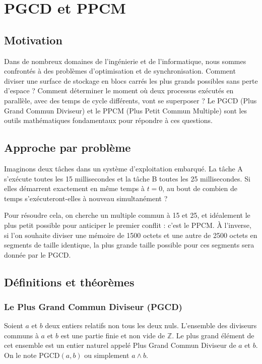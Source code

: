 \section{PGCD et PPCM}

\subsection{Motivation}
Dans de nombreux domaines de l'ingénierie et de l'informatique, nous sommes confrontés à des problèmes d'optimisation et de synchronisation. Comment diviser une surface de stockage en blocs carrés les plus grands possibles sans perte d'espace ? Comment déterminer le moment où deux processus exécutés en parallèle, avec des temps de cycle différents, vont se superposer ? Le PGCD (Plus Grand Commun Diviseur) et le PPCM (Plus Petit Commun Multiple) sont les outils mathématiques fondamentaux pour répondre à ces questions.

\subsection{Approche par problème}
Imaginons deux tâches dans un système d'exploitation embarqué. La tâche A s'exécute toutes les 15 millisecondes et la tâche B toutes les 25 millisecondes. Si elles démarrent exactement en même temps à $t=0$, au bout de combien de temps s'exécuteront-elles à nouveau simultanément ?

Pour résoudre cela, on cherche un multiple commun à 15 et 25, et idéalement le plus petit possible pour anticiper le premier conflit : c'est le PPCM. 
À l'inverse, si l'on souhaite diviser une mémoire de 1500 octets et une autre de 2500 octets en segments de taille identique, la plus grande taille possible pour ces segments sera donnée par le PGCD.

\subsection{Définitions et théorèmes}

\subsubsection{Le Plus Grand Commun Diviseur (PGCD)}

\begin{definition}[PGCD]
Soient $a$ et $b$ deux entiers relatifs non tous les deux nuls. L'ensemble des diviseurs communs à $a$ et $b$ est une partie finie et non vide de $\mathbb{Z}$. Le plus grand élément de cet ensemble est un entier naturel appelé Plus Grand Commun Diviseur de $a$ et $b$. 
On le note $\text{PGCD}(a, b)$ ou simplement $a \wedge b$.
\end{definition}


